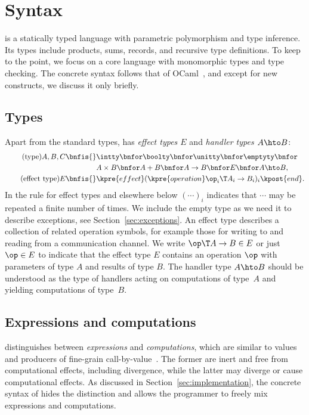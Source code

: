 \section{Syntax}
\label{sec:syntax}

\Eff is a statically typed language with parametric polymorphism and type
inference. Its types include products, sums, records, and recursive type
definitions. To keep to the point, we focus on a core language with
monomorphic types and type checking. The concrete syntax follows that of OCaml~\cite{OCaml}, and except for new constructs, we discuss it only briefly.

\subsection{Types}
\label{sec:types}

Apart from the standard types, \eff has \emph{effect types $E$} and \emph{handler
  types $A \hto B$}:
%
\begin{align*}
  \tag{type}
  A, B, C \bnfis {}
    &\intty \bnfor
    \boolty \bnfor
    \unitty \bnfor
    \emptyty \bnfor
    \\
    &A \times B \bnfor
    A + B \bnfor
    A \to B \bnfor
    E \bnfor
    A \hto B,\\
  \tag{effect type}
  E \bnfis {}
    &\kpre{effect} (\kpre{operation} \op_i \T A_i \to B_i)_i \kpost{end}.
\end{align*}
%
In the rule for effect types and elsewhere below $(\cdots)_i$ indicates that
$\cdots$ may be repeated a finite number of times. We include the empty type
as we need it to describe exceptions, see Section~\ref{sec:exceptions}.
%
An effect type describes a collection of related operation symbols, for example those for
writing to and reading from a communication channel. We write $\op \T A \to B \in E$ or
just $\op \in E$ to indicate that the effect type $E$ contains an operation $\op$ with parameters of
type $A$ and results of type $B$.
%
The handler type $A \hto B$ should be understood as the type of handlers acting on
computations of type~$A$ and yielding computations of type~$B$.

\subsection{Expressions and computations}

\Eff distinguishes between \emph{expressions} and \emph{computations}, which are
similar to values and producers of fine-grain call-by-value~\cite{levy03modelling}. The former are inert and free from computational
effects, including divergence, while the latter may diverge or cause
computational effects. As discussed in Section~\ref{sec:implementation}, the
concrete syntax of \eff hides the distinction and allows the programmer to
freely mix expressions and computations.

